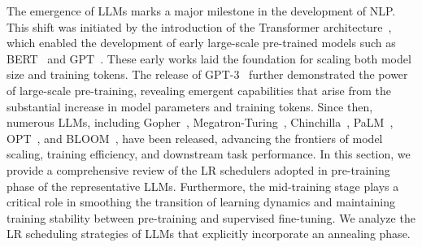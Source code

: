 The emergence of LLMs marks a major milestone in the development of NLP. This shift was initiated by the introduction of the Transformer architecture~\cite{vaswani2017attention}, which enabled the development of early large-scale pre-trained models such as BERT~\cite{devlin2019bert} and GPT~\cite{brown2020language}. These early works laid the foundation for scaling both model size and training tokens. The release of GPT-3~\cite{brown2020language} further demonstrated the power of large-scale pre-training, revealing emergent capabilities that arise from the substantial  increase in model parameters and training tokens. Since then, numerous LLMs, including Gopher~\cite{rae2021scaling}, Megatron-Turing~\cite{adler2024nemotron}, Chinchilla~\cite{hoffmann2022training}, PaLM~\cite{chowdhery2023palm}, OPT~\cite{zhang2022opt}, and BLOOM~\cite{workshop2022bloom}, have been released, advancing the frontiers of model scaling, training efficiency, and downstream task performance. In this section, we provide a comprehensive review of the LR schedulers adopted in pre-training phase of the representative LLMs. Furthermore, the mid-training stage plays a critical role in smoothing the transition of learning dynamics and maintaining training stability between pre-training and supervised fine-tuning. We analyze the LR scheduling strategies of LLMs that explicitly incorporate an annealing phase.

